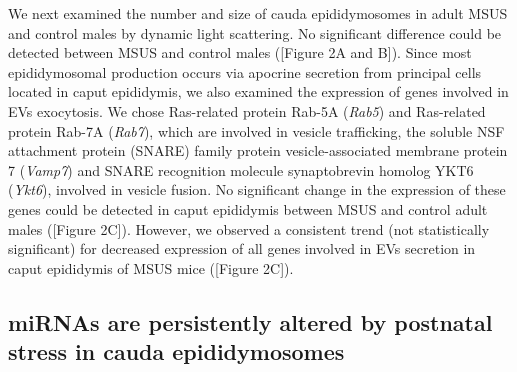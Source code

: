 \documentclass[12pt,twoside]{reedthesis}
\begin{document}
We next examined the number and size of cauda epididymosomes in adult
MSUS and control males by dynamic light scattering. No significant
difference could be detected between MSUS and control males ({[}Figure 2A
and B{]}). Since most epididymosomal production occurs via apocrine
secretion from principal cells located in caput epididymis, we also
examined the expression of genes involved in EVs exocytosis. We chose
Ras-related protein Rab-5A (\emph{Rab5}) and Ras-related protein Rab-7A
(\emph{Rab7}), which are involved in vesicle trafficking, the soluble NSF
attachment protein (SNARE) family protein vesicle-associated membrane
protein 7 (\emph{Vamp7}) and SNARE recognition molecule synaptobrevin homolog
YKT6 (\emph{Ykt6}), involved in vesicle fusion. No significant change in the
expression of these genes could be detected in caput epididymis between
MSUS and control adult males ({[}Figure 2C{]}). However, we observed a
consistent trend (not statistically significant) for decreased
expression of all genes involved in EVs secretion in caput epididymis of
MSUS mice ({[}Figure 2C{]}).

\hypertarget{mirnas-are-persistently-altered-by-postnatal-stress-in-cauda-epididymosomes}{%
\subsection{miRNAs are persistently altered by postnatal stress in cauda epididymosomes}\label{mirnas-are-persistently-altered-by-postnatal-stress-in-cauda-epididymosomes}}
\end{document}
